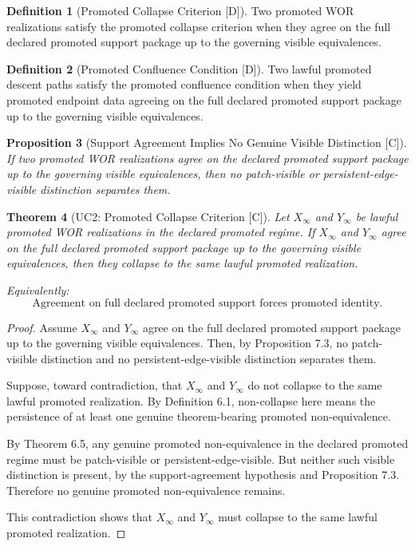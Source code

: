 \documentclass[11pt]{article}
\newtheorem{theorem}{Theorem}[section]
\newtheorem{proposition}[theorem]{Proposition}
\theoremstyle{definition}
\newtheorem{definition}[theorem]{Definition}
\theoremstyle{remark}
\newcommand{\C}{\textnormal{[C]}}
\newcommand{\D}{\textnormal{[D]}}
\newcommand{\Xinf}{X_\infty}
\begin{document}
\begin{definition}[Promoted Collapse Criterion {\D}]
Two promoted WOR realizations satisfy the promoted collapse criterion when they agree on the full declared promoted support package up to the governing visible equivalences.
\end{definition}

\begin{definition}[Promoted Confluence Condition {\D}]
Two lawful promoted descent paths satisfy the promoted confluence condition when they yield promoted endpoint data agreeing on the full declared promoted support package up to the governing visible equivalences.
\end{definition}

\begin{proposition}[Support Agreement Implies No Genuine Visible Distinction {\C}]
If two promoted WOR realizations agree on the declared promoted support package up to the governing visible equivalences, then no patch-visible or persistent-edge-visible distinction separates them.
\end{proposition}

\begin{theorem}[UC2: Promoted Collapse Criterion {\C}]
Let \(\Xinf\) and \(Y_\infty\) be lawful promoted WOR realizations in the declared promoted regime. If \(\Xinf\) and \(Y_\infty\) agree on the full declared promoted support package up to the governing visible equivalences, then they collapse to the same lawful promoted realization.

Equivalently:
\[
\boxed{
\text{Agreement on full declared promoted support forces promoted identity.}
}
\]
\end{theorem}

\begin{proof}
Assume \(\Xinf\) and \(Y_\infty\) agree on the full declared promoted support package up to the governing visible equivalences. Then, by Proposition 7.3, no patch-visible distinction and no persistent-edge-visible distinction separates them.

Suppose, toward contradiction, that \(\Xinf\) and \(Y_\infty\) do not collapse to the same lawful promoted realization. By Definition 6.1, non-collapse here means the persistence of at least one genuine theorem-bearing promoted non-equivalence.

By Theorem 6.5, any genuine promoted non-equivalence in the declared promoted regime must be patch-visible or persistent-edge-visible. But neither such visible distinction is present, by the support-agreement hypothesis and Proposition 7.3. Therefore no genuine promoted non-equivalence remains.

This contradiction shows that \(\Xinf\) and \(Y_\infty\) must collapse to the same lawful promoted realization. \qedhere
\end{proof}
\end{document}
